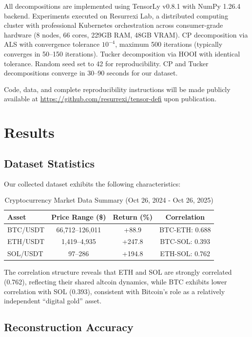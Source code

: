 \documentclass[11pt,twocolumn]{article}
\begin{document}
All decompositions are implemented using TensorLy v0.8.1 \citep{Kossaifi2019TensorLy} with NumPy 1.26.4 backend. Experiments executed on Resurrexi Lab, a distributed computing cluster with professional Kubernetes orchestration across consumer-grade hardware (8 nodes, 66 cores, 229GB RAM, 48GB VRAM). CP decomposition via ALS with convergence tolerance $10^{-4}$, maximum 500 iterations (typically converges in 50--150 iterations). Tucker decomposition via HOOI with identical tolerance. Random seed set to 42 for reproducibility. CP and Tucker decompositions converge in 30--90 seconds for our dataset.

Code, data, and complete reproducibility instructions will be made publicly available at \url{https://github.com/resurrexi/tensor-defi} upon publication.

\section{Results}
\label{sec:results}

\subsection{Dataset Statistics}

Our collected dataset exhibits the following characteristics:

\begin{table}[htbp]
\centering
\small
\caption{Cryptocurrency Market Data Summary (Oct 26, 2024 - Oct 26, 2025)}
\label{tbl:dataset-stats}
\begin{tabular}{lccc}
\toprule
\textbf{Asset} & \textbf{Price Range (\$)} & \textbf{Return (\%)} & \textbf{Correlation} \\
\midrule
BTC/USDT & 66,712--126,011 & +88.9 & BTC-ETH: 0.688 \\
ETH/USDT & 1,419--4,935 & +247.8 & BTC-SOL: 0.393 \\
SOL/USDT & 97--286 & +194.8 & ETH-SOL: 0.762 \\
\bottomrule
\end{tabular}
\end{table}

The correlation structure reveals that ETH and SOL are strongly correlated (0.762), reflecting their shared altcoin dynamics, while BTC exhibits lower correlation with SOL (0.393), consistent with Bitcoin's role as a relatively independent ``digital gold'' asset.

\subsection{Reconstruction Accuracy}
\end{document}
